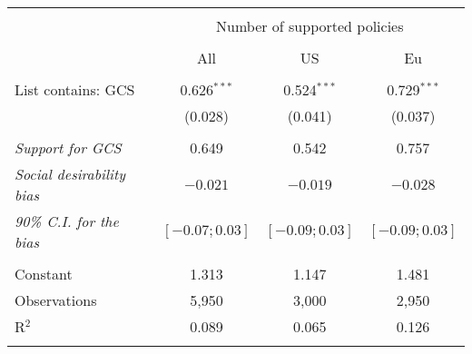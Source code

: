 
\begin{tabular}{@{\extracolsep{5pt}}lccc} 
\\[-1.8ex]\hline 
\hline \\[-1.8ex] 
 & \multicolumn{3}{c}{Number of supported policies} \\ 
\cline{2-4} 
\\[-1.8ex] & All & US & Eu \\ 
\hline \\[-1.8ex] 
 List contains: GCS & 0.626$^{***}$ & 0.524$^{***}$ & 0.729$^{***}$ \\ 
  & (0.028) & (0.041) & (0.037) \\ 
\hline  \\[-1.8ex] \textit{Support for GCS} & 0.649  &  0.542  &  0.757 \\
\textit{Social desirability bias} & \textit{$ -0.021 $} & \textit{$ -0.019 $} & \textit{$ -0.028 $}\\
\textit{90\% C.I. for the bias} & \textit{ $[ -0.07 ; 0.03 ]$ } & \textit{ $[ -0.09 ; 0.03 ]$} & \textit{ $[ -0.09 ; 0.03 ]$}\\
 \hline \\[-1.8ex] 
Constant & 1.313 & 1.147 & 1.481 \\ 
Observations & 5,950 & 3,000 & 2,950 \\ 
R$^{2}$ & 0.089 & 0.065 & 0.126 \\ 
\hline 
\hline \\[-1.8ex] 
\end{tabular} 